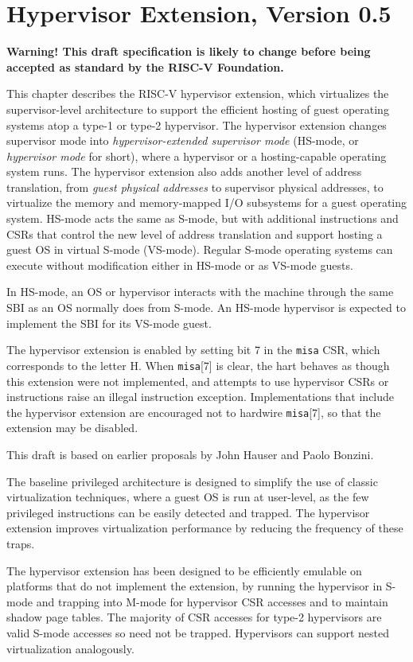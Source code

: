 \chapter{Hypervisor Extension, Version 0.5}
\label{hypervisor}

{\bf Warning! This draft specification is likely to change before being
accepted as standard by the RISC-V Foundation.}

This chapter describes the RISC-V hypervisor extension, which virtualizes the
supervisor-level architecture to support the efficient hosting of guest
operating systems atop a type-1 or type-2 hypervisor.
The hypervisor extension changes supervisor mode into
{\em hypervisor-extended supervisor mode} (HS-mode, or {\em hypervisor
mode} for short), where a hypervisor or a hosting-capable operating system
runs.  The hypervisor extension also adds another level of address translation,
from {\em guest physical addresses} to supervisor physical addresses,
to virtualize the
memory and memory-mapped I/O subsystems for a guest operating system.  HS-mode
acts the same as S-mode, but with additional instructions and CSRs that control
the new level of address translation and support hosting a guest OS in virtual
S-mode (VS-mode).
Regular S-mode operating systems can execute without modification either in
HS-mode or as VS-mode guests.

In HS-mode, an OS or hypervisor interacts with the machine through the same
SBI as an OS normally does from S-mode.  An HS-mode hypervisor is expected to
implement the SBI for its VS-mode guest.

The hypervisor extension is enabled by setting bit 7 in the {\tt misa} CSR,
which corresponds to the letter H.  When {\tt misa}[7] is clear, the hart
behaves as though this extension were not implemented, and attempts to use
hypervisor CSRs or instructions raise an illegal instruction exception.
Implementations that include the hypervisor extension are encouraged
not to hardwire {\tt misa}[7], so that the extension may be disabled.

\begin{commentary}
This draft is based on earlier proposals by John Hauser and Paolo Bonzini.
\end{commentary}

\begin{commentary}
The baseline privileged architecture is designed to simplify the use of classic
virtualization techniques, where a guest OS is run at user-level, as
the few privileged instructions can be easily detected and trapped.
The hypervisor extension improves virtualization performance by
reducing the frequency of these traps.

The hypervisor extension has been designed to be efficiently
emulable on platforms that do not implement the extension, by running
the hypervisor in S-mode and trapping into M-mode for hypervisor CSR accesses
and to maintain shadow page tables.  The majority of CSR accesses for
type-2 hypervisors are valid S-mode accesses so need not be trapped.
Hypervisors can support nested virtualization analogously.
\end{commentary}

